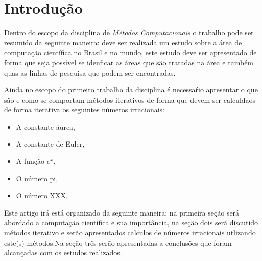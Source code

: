 \section*{Introdução}

	Dentro do escopo da disciplina de \emph{Métodos Computacionais} o trabalho
	pode ser resumido da seguinte maneira: deve ser realizada um estudo sobre a
	área de computação científica no Brasil e no mundo, este estudo deve ser
	apresentado de forma que seja possível se idenficar as áreas que são
	tratadas na área e também quas as linhas de pesquisa que podem ser
	encontradas.

	Ainda no escopo do primeiro trabalho da disciplina é necessaŕio apresentar o
	que são e como se comportam métodos iterativos de forma que devem ser
	calculdaos de forma iterativa os seguintes números irracionais:

	\begin{itemize}
		\item A constante áurea,
		\item A constante de Euler,
		\item A função $e^x$,
		\item O número pi,
		\item O número XXX.
	\end{itemize}

	Este artigo irá está organizado da seguinte maneira: na primeira seção será
	abordado a computação científica e sua importância, na seção dois será
	discutido métodos iterativo e serão apresentados calculos de números irracionais utlizando
	este(s) métodos.Na seção três serão apresentadas a conclusões que
	foram alcançadas com os estudos realizados.
